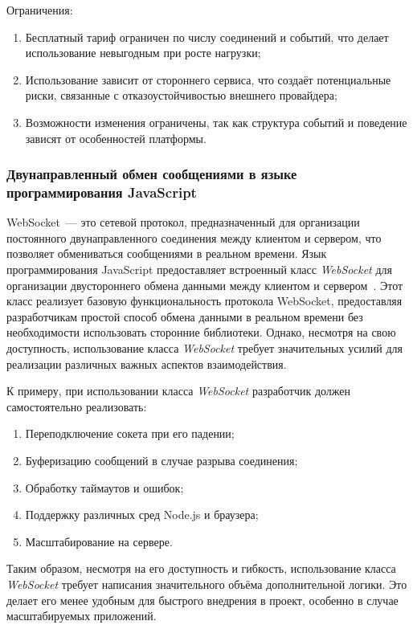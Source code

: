 Ограничения:
\begin{enumerate}
  \item Бесплатный тариф ограничен по числу соединений и событий, что делает использование невыгодным при росте нагрузки;
  \item Использование зависит от стороннего сервиса, что создаёт потенциальные риски, связанные с отказоустойчивостью внешнего провайдера;
  \item Возможности изменения ограничены, так как структура событий и поведение зависят от особенностей платформы.
\end{enumerate}

\subsubsection*{Двунаправленный обмен сообщениями в языке программирования JavaScript}

WebSocket~--- это сетевой протокол, предназначенный для организации постоянного двунаправленного соединения между клиентом и сервером, что позволяет обмениваться сообщениями в реальном времени. Язык программирования JavaScript предоставляет встроенный класс \textit{WebSocket} для организации двустороннего обмена данными между клиентом и сервером~\cite{mdn_websocket_api}. Этот класс реализует базовую функциональность протокола WebSocket, предоставляя разработчикам простой способ обмена данными в реальном времени без необходимости использовать сторонние библиотеки. Однако, несмотря на свою доступность, использование класса \textit{WebSocket} требует значительных усилий для реализации различных важных аспектов взаимодействия.

К примеру, при использовании класса \textit{WebSocket} разработчик должен самостоятельно реализовать:
\begin{enumerate}
  \item Переподключение сокета при его падении;
  \item Буферизацию сообщений в случае разрыва соединения;
  \item Обработку таймаутов и ошибок;
  \item Поддержку различных сред Node.js и браузера;
  \item Масштабирование на сервере.
\end{enumerate}

Таким образом, несмотря на его доступность и гибкость, использование класса \textit{WebSocket} требует написания значительного объёма дополнительной логики. Это делает его менее удобным для быстрого внедрения в проект, особенно в случае масштабируемых приложений.

